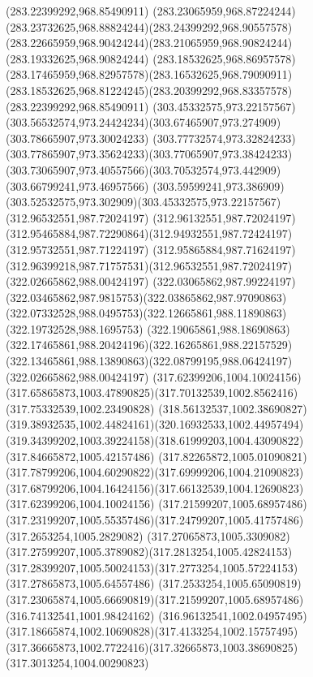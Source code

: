 {    \moveto(283.22399292,968.85490911)
    \curveto(283.23065959,968.87224244)(283.23732625,968.88824244)(283.24399292,968.90557578)
    \curveto(283.22665959,968.90424244)(283.21065959,968.90824244)(283.19332625,968.90824244)
    \curveto(283.18532625,968.86957578)(283.17465959,968.82957578)(283.16532625,968.79090911)
    \curveto(283.18532625,968.81224245)(283.20399292,968.83357578)(283.22399292,968.85490911)
    \moveto(303.45332575,973.22157567)
    \curveto(303.56532574,973.24424234)(303.67465907,973.274909)(303.78665907,973.30024233)
    \curveto(303.77732574,973.32824233)(303.77865907,973.35624233)(303.77065907,973.38424233)
    \curveto(303.73065907,973.40557566)(303.70532574,973.442909)(303.66799241,973.46957566)
    \curveto(303.59599241,973.386909)(303.52532575,973.302909)(303.45332575,973.22157567)
    \moveto(312.96532551,987.72024197)
    \curveto(312.96132551,987.72024197)(312.95465884,987.72290864)(312.94932551,987.72424197)
    \lineto(312.95732551,987.71224197)
    \curveto(312.95865884,987.71624197)(312.96399218,987.71757531)(312.96532551,987.72024197)
    \moveto(322.02665862,988.00424197)
    \curveto(322.03065862,987.99224197)(322.03465862,987.9815753)(322.03865862,987.97090863)
    \curveto(322.07332528,988.0495753)(322.12665861,988.11890863)(322.19732528,988.1695753)
    \curveto(322.19065861,988.18690863)(322.17465861,988.20424196)(322.16265861,988.22157529)
    \curveto(322.13465861,988.13890863)(322.08799195,988.06424197)(322.02665862,988.00424197)
    \moveto(317.62399206,1004.10024156)
    \curveto(317.65865873,1003.47890825)(317.70132539,1002.8562416)(317.75332539,1002.23490828)
    \curveto(318.56132537,1002.38690827)(319.38932535,1002.44824161)(320.16932533,1002.44957494)
    \curveto(319.34399202,1003.39224158)(318.61999203,1004.43090822)(317.84665872,1005.42157486)
    \curveto(317.82265872,1005.01090821)(317.78799206,1004.60290822)(317.69999206,1004.21090823)
    \curveto(317.68799206,1004.16424156)(317.66132539,1004.12690823)(317.62399206,1004.10024156)
    \moveto(317.21599207,1005.68957486)
    \curveto(317.23199207,1005.55357486)(317.24799207,1005.41757486)(317.2653254,1005.2829082)
    \curveto(317.27065873,1005.3309082)(317.27599207,1005.3789082)(317.2813254,1005.42824153)
    \curveto(317.28399207,1005.50024153)(317.2773254,1005.57224153)(317.27865873,1005.64557486)
    \curveto(317.2533254,1005.65090819)(317.23065874,1005.66690819)(317.21599207,1005.68957486)
    \moveto(316.74132541,1001.98424162)
    \curveto(316.96132541,1002.04957495)(317.18665874,1002.10690828)(317.4133254,1002.15757495)
    \curveto(317.36665873,1002.7722416)(317.32665873,1003.38690825)(317.3013254,1004.00290823)
}
